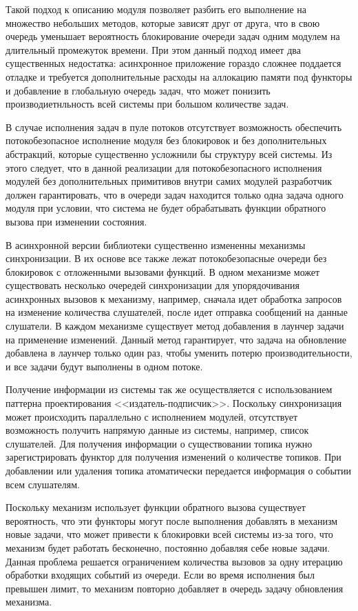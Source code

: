 Такой подход к описанию модуля позволяет разбить его выполнение на множество небольших методов, которые зависят друг от друга, что в свою очередь уменьшает вероятность блокирование очереди задач одним модулем на длительный промежуток времени. При этом данный подход имеет два существенных недостатка: асинхронное приложение гораздо сложнее поддается отладке и требуется дополнительные расходы на аллокацию памяти под функторы и добавление в глобальную очередь задач, что может понизить производиетнльность всей системы при большом количестве задач.

В случае исполнения задач в пуле потоков отсутствует возможность обеспечить потокобезопасное исполнение модуля без блокировок и без дополнительных абстракций, которые существенно усложнили бы структуру всей системы. Из этого следует, что в данной реализации для потокобезопасного исполнения модулей без дополнительных примитивов внутри самих модулей разработчик должен гарантировать, что в очереди задач находится только одна задача одного модуля при условии, что система не будет обрабатывать функции обратного вызова при изменении состояния.

В асинхронной версии библиотеки существенно измененны механизмы синхронизации. В их основе все также лежат потокобезопасные очереди без блокировок с отложенными вызовами функций. В одном механизме может существовать несколько очередей синхронизации для упорядочивания асинхронных вызовов к механизму, например, сначала идет обработка запросов на изменение количества слушателей, после идет отправка сообщений на данные слушатели. В каждом механизме существует метод добавления в лаунчер задачи на применение изменений. Данный метод гарантирует, что задача на обновление добавлена в лаунчер только один раз, чтобы уменить потерю производительности, и все задачи будут выполнены в одном потоке.

Получение информации из системы так же осуществляется с использованием паттерна проектирования <<издатель-подписчик>>. Поскольку синхронизация может происходить параллельно с исполнением модулей, отсутствует возможность получить напрямую данные из системы, например, список слушателей. Для получения информации о существовании топика нужно зарегистрировать функтор для получения изменений о количестве топиков. При добавлении или удаления топика атоматически передается информация о событии всем слушателям.

Поскольку механизм использует функции обратного вызова существует вероятность, что эти функторы могут после выполнения добавлять в механизм новые задачи, что может привести к блокировки всей системы из-за того, что механизм будет работать бесконечно, постоянно добавляя себе новые задачи. Данная проблема решается ограничением количества вызовов за одну итерацию обработки входящих событий из очереди. Если во время исполнения был превышен лимит, то механизм повторно добавляет в очередь задачу обновления механизма.

